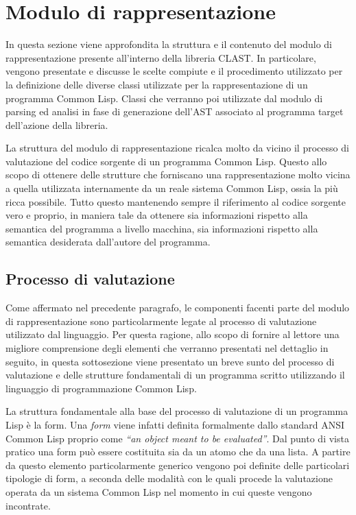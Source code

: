 \section{Modulo di rappresentazione}
\label{representation}

In questa sezione viene approfondita la struttura e il contenuto del modulo di
rappresentazione presente all'interno della libreria CLAST. In particolare,
vengono presentate e discusse le scelte compiute e il procedimento utilizzato
per la definizione delle diverse classi utilizzate per la rappresentazione di un
programma Common Lisp. Classi che verranno poi utilizzate dal modulo di parsing
ed analisi in fase di generazione dell'AST associato al programma target
dell'azione della libreria.

La struttura del modulo di rappresentazione ricalca molto da vicino il processo
di valutazione del codice sorgente di un programma Common Lisp. Questo allo
scopo di ottenere delle strutture che forniscano una rappresentazione molto
vicina a quella utilizzata internamente da un reale sistema Common Lisp, ossia
la più ricca possibile. Tutto questo mantenendo sempre il riferimento al codice
sorgente vero e proprio, in maniera tale da ottenere sia informazioni rispetto
alla semantica del programma a livello macchina, sia informazioni rispetto alla
semantica desiderata dall’autore del programma.

\subsection{Processo di valutazione}
\label{CL-valutazione}

Come affermato nel precedente paragrafo, le componenti facenti parte del
modulo di rappresentazione sono particolarmente legate al processo di
valutazione utilizzato dal linguaggio. Per questa ragione, allo scopo di
fornire al lettore una migliore comprensione degli elementi che verranno
presentati nel dettaglio in seguito, in questa sottosezione viene presentato
un breve sunto del processo di valutazione e delle strutture fondamentali di
un programma scritto utilizzando il linguaggio di programmazione Common
Lisp.

La struttura fondamentale alla base del processo di valutazione di un programma
Lisp è la form. Una \textit{form} viene infatti definita formalmente dallo
standard ANSI Common Lisp proprio come \textit{“an object meant to be
evaluated”}. Dal punto di vista pratico una form può essere costituita sia da un
atomo che da una lista. A partire da questo elemento particolarmente generico
vengono poi definite delle particolari tipologie di form, a seconda delle
modalità con le quali procede la valutazione operata da un sistema Common Lisp
nel momento in cui queste vengono incontrate.

